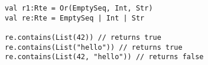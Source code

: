 \begin{lstlisting}[style=reclojureScala]
val r1:Rte = Or(EmptySeq, Int, Str)
val re:Rte = EmptySeq | Int | Str
      
re.contains(List(42)) // returns true
re.contains(List("hello")) // returns true
re.contains(List(42, "hello")) // returns false
\end{lstlisting}
